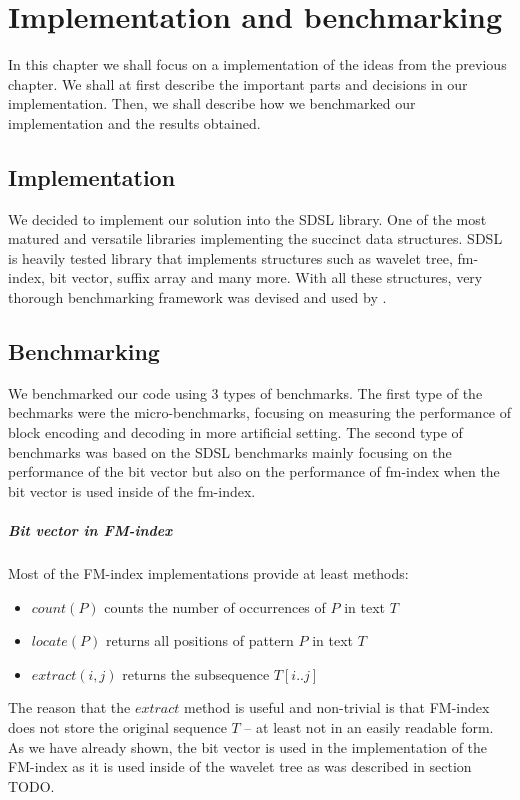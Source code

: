 \chapter{Implementation and benchmarking}
\label{kap:kap4}

In this chapter we shall focus on a implementation of the ideas from the
previous chapter. We shall at first describe the important parts and
decisions in our implementation. Then, we shall describe how we benchmarked
our implementation and the results obtained.

\section{Implementation}

We decided to implement our solution into the SDSL library. One of the most
matured and versatile libraries implementing the succinct data structures.
SDSL is heavily tested library that implements structures such as wavelet tree,
fm-index, bit vector, suffix array and many more. With all these structures,
very thorough benchmarking framework was devised and used by \cite{gog2014optimized}.

\section{Benchmarking}

We benchmarked our code using 3 types of benchmarks. The first type of the bechmarks
were the micro-benchmarks, focusing on measuring the performance of block encoding
and decoding in more artificial setting. The second type of benchmarks was based on
the SDSL benchmarks mainly focusing on the performance of the bit vector but also
on the performance of fm-index when the bit vector is used inside of the fm-index.

\paragraph{Bit vector in FM-index}
Most of the FM-index implementations provide at least methods:
\begin{itemize}
	\item $\mathit{count}(P)$ counts the number of occurrences of $P$ in text $T$
	\item $\mathit{locate}(P)$ returns all positions of pattern $P$ in text $T$
	\item $\mathit{extract}(i, j)$ returns the subsequence $T[i..j]$
\end{itemize}
The reason that the $\mathit{extract}$ method is useful and non-trivial is that FM-index
does not store the original sequence $T$ -- at least not in an easily readable form.
As we have already shown, the bit vector is used in the implementation of the FM-index as it is
used inside of the wavelet tree as was described in section TODO.